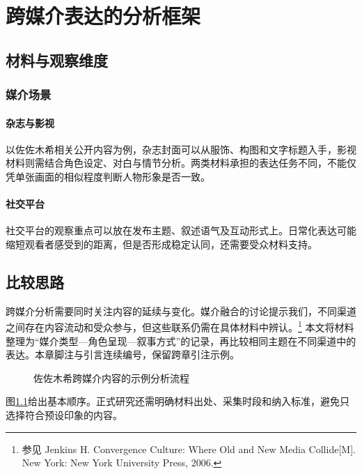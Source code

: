 \chapter{跨媒介表达的分析框架}
\section{材料与观察维度}
\subsection{媒介场景}
\subsubsection{杂志与影视}
以佐佐木希相关公开内容为例，杂志封面可以从服饰、构图和文字标题入手，影视材料则需结合角色设定、对白与情节分析。两类材料承担的表达任务不同，不能仅凭单张画面的相似程度判断人物形象是否一致。

\subsubsection{社交平台}
社交平台的观察重点可以放在发布主题、叙述语气及互动形式上。日常化表达可能缩短观看者感受到的距离，但是否形成稳定认同，还需要受众材料支持。

\section{比较思路}
跨媒介分析需要同时关注内容的延续与变化。媒介融合的讨论提示我们，不同渠道之间存在内容流动和受众参与，但这些联系仍需在具体材料中辨认。\footnote{参见 Jenkins H. Convergence Culture: Where Old and New Media Collide[M]. New York: New York University Press, 2006.}
本文将材料整理为“媒介类型—角色呈现—叙事方式”的记录，再比较相同主题在不同渠道中的表达。本章脚注与引言连续编号，保留跨章引注示例。

\begin{figure}[htbp]
  \centering
  \caption{佐佐木希跨媒介内容的示例分析流程}
  \label{fig:media-flow}
\end{figure}

图\ref{fig:media-flow}给出基本顺序。正式研究还需明确材料出处、采集时段和纳入标准，避免只选择符合预设印象的内容。
